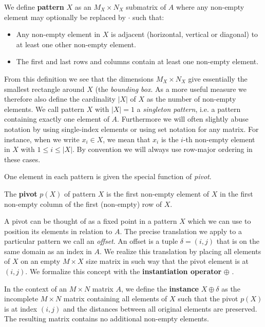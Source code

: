 \documentclass{llncs}
\begin{document}
\begin{definition}
We define \textbf{pattern} $X$ as an $M_X\times N_X$ submatrix of $A$ where any non-empty element may optionally be replaced by $\cdot$ such that:
\begin{itemize}
\item Any non-empty element in $X$ is adjacent (horizontal, vertical or diagonal) to at least one other non-empty element.
\item The first and last rows and columns contain at least one non-empty element.
\end{itemize}
\end{definition}

From this definition we see that the dimensions $M_X\times N_X$ give essentially the smallest rectangle around $X$ (the \emph{bounding box}. As a more useful measure we therefore also define the cardinality $|X|$ of $X$ as the number of non-empty elements. We call pattern $X$ with $|X|=1$ a \emph{singleton pattern}, i.e. a pattern containing exactly one element of $A$. Furthermore we will often slightly abuse notation by using single-index elements or using set notation for any matrix. For instance, when we write $x_i \in X$, we mean that $x_i$ is the $i$-th non-empty element in $X$ with $1\leq i \leq |X|$. By convention we will always use row-major ordering in these cases.

One element in each pattern is given the special function of \emph{pivot}. 

\begin{definition}
The \textbf{pivot} $p(X)$ of pattern $X$ is the first non-empty element of $X$ in the first non-empty column of the first (non-empty) row of $X$.
\end{definition}

A pivot can be thought of as a fixed point in a pattern $X$ which we can use to position its elements in relation to $A$. The precise translation we apply to a particular pattern we call an \emph{offset}. An offset is a tuple $\delta=(i,j)$ that is on the same domain as an index in $A$. We realize this translation by placing all elements of $X$ on an empty $M\times X$ size matrix in such way that the pivot element is at $(i,j)$. We formalize this concept with the \textbf{instantiation operator} $\oplus$ .

\begin{definition}
In the context of an $M\times N$ matrix $A$, we define the \textbf{instance} $X \oplus \delta$ as the incomplete $M\times N$ matrix containing all elements of $X$ such that the pivot $p(X)$ is at index $(i,j)$ and the distances between all original elements are preserved. The resulting matrix contains no additional non-empty elements. 
\end{definition}
\end{document}
